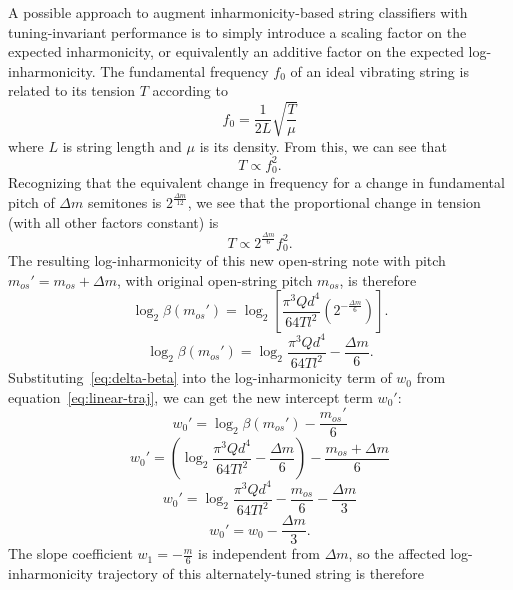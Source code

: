 \documentclass[12pt]{cmuthesis}
\begin{document}
A possible approach to augment inharmonicity-based string classifiers with tuning-invariant performance is to simply introduce a scaling factor on the expected inharmonicity, or equivalently an additive factor on the expected log-inharmonicity. The fundamental frequency $f_0$ of an ideal vibrating string is related to its tension $T$ according to
\begin{equation}
f_0 = \frac{1}{2L}\sqrt{\frac{T}{\mu}}
\label{eq:freq-tension}
\end{equation}
where $L$ is string length and $\mu$ is its density. From this, we can see that
\begin{equation}
T \propto f_0^{2}.
\end{equation}
Recognizing that the equivalent change in frequency for a change in fundamental pitch of $\Delta m$ semitones is $2^{\frac{\Delta m}{12}}$, we see that the proportional change in tension (with all other factors constant) is
\begin{equation}
T \propto 2^{\frac{\Delta m}{6}}f_0^2.
\end{equation}
The resulting log-inharmonicity of this new open-string note with pitch $m_{os}' = m_{os}+\Delta m$, with original open-string pitch $m_{os}$, is therefore
\begin{equation}
\log_2\beta(m_{os}') = \log_2[ \frac{\pi^3 Q d^4}{64 T l^2}(2^{-\frac{\Delta m}{6}})].
\end{equation}
\begin{equation}
\label{eq:delta-beta}
\log_2\beta(m_{os}') = \log_2\frac{\pi^3 Q d^4}{64 T l^2} - \frac{\Delta m}{6}.
\end{equation}
Substituting~\eqref{eq:delta-beta} into the log-inharmonicity term of $w_0$ from equation~\eqref{eq:linear-traj}, we can get the new intercept term $w_0':$
\begin{equation}
w_{0}' = \log_2{\beta}(m_{os}') - \frac{m_{os}'}{6}
\end{equation}
\begin{equation}
w_{0}' = (\log_2\frac{\pi^3 Q d^4}{64 T l^2} - \frac{\Delta m}{6}) - \frac{m_{os}+\Delta m}{6}
\end{equation}
\begin{equation}
\label{eq:3.17}
w_{0}' = \log_2\frac{\pi^3 Q d^4}{64 T l^2} - \frac{m_{os}}{6} - \frac{\Delta m}{3}
\end{equation}
\begin{equation}
\label{eq:3.18}
w_{0}' = w_0 - \frac{\Delta m}{3}.
\end{equation}
The slope coefficient $w_1 = -\frac{m}{6}$ is independent from ${\Delta m}$, so the affected log-inharmonicity trajectory of this alternately-tuned string is therefore
\end{document}
